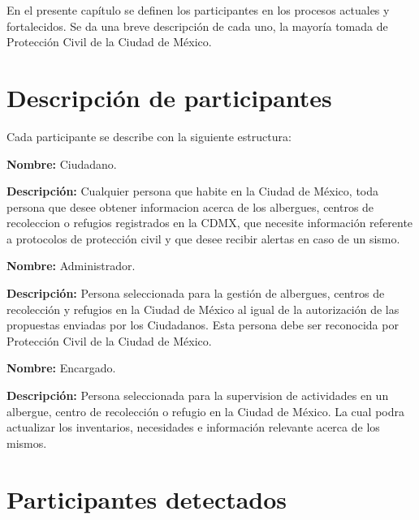 \label{chapter:ActoresDelSistema}

	En el presente capítulo se definen los participantes en los procesos actuales y fortalecidos. Se da una breve descripción de cada uno, la mayoría tomada de Protección Civil de la Ciudad de México.

\section{Descripción de participantes}

Cada participante se describe con la siguiente estructura:

\begin{objetivos}
	\item {\bf Nombre:} Ciudadano.
	\item {\bf Descripción:} Cualquier persona que habite en la Ciudad de México, toda persona que desee obtener informacion acerca de los albergues, centros de recoleccion o refugios registrados en la CDMX, que necesite información referente a protocolos de protección civil y que desee recibir alertas en caso de un sismo.
	
	\item {\bf Nombre:} Administrador.
	\item {\bf Descripción:} Persona seleccionada para la gestión de albergues, centros de recolección y refugios en la Ciudad de México al igual de la autorización de las propuestas enviadas por los Ciudadanos. Esta persona debe ser reconocida por Protección Civil de la Ciudad de México.
	
	\item {\bf Nombre:} Encargado.
	\item {\bf Descripción:} Persona seleccionada para la supervision de actividades en un albergue, centro de recolección o refugio en la Ciudad de México. La cual podra actualizar los inventarios, necesidades e información relevante acerca de los mismos.
\end{objetivos}

\section{Participantes detectados}

